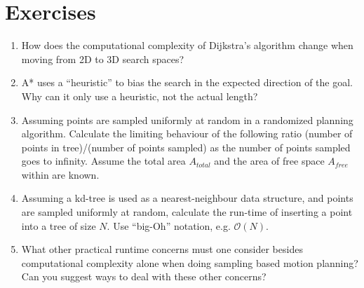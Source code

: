 \section*{Exercises}\small
\begin{enumerate}
\item How does the computational complexity of Dijkstra's algorithm change when moving from 2D to 3D search spaces?
\item A* uses a ``heuristic'' to bias the search in the expected direction of the goal. Why can it only use a heuristic, not the actual length?
\item Assuming points are sampled uniformly at random in a randomized planning algorithm. Calculate the limiting behaviour of the following ratio   (number of points in tree)/(number of points sampled) as the number of points sampled goes to infinity. Assume the total area $A_{total}$ and the area of free space $A_{free}$ within are known.

\item Assuming a kd-tree is used as a nearest-neighbour data structure, and points are sampled uniformly at random, calculate the  run-time of inserting a point into a tree of size $N$. Use ``big-Oh'' notation, e.g. $\mathcal{O}(N)$.

\item What other practical runtime concerns must one consider besides computational complexity alone when doing sampling based motion planning? Can you suggest ways to deal with these other concerns?


\end{enumerate}
